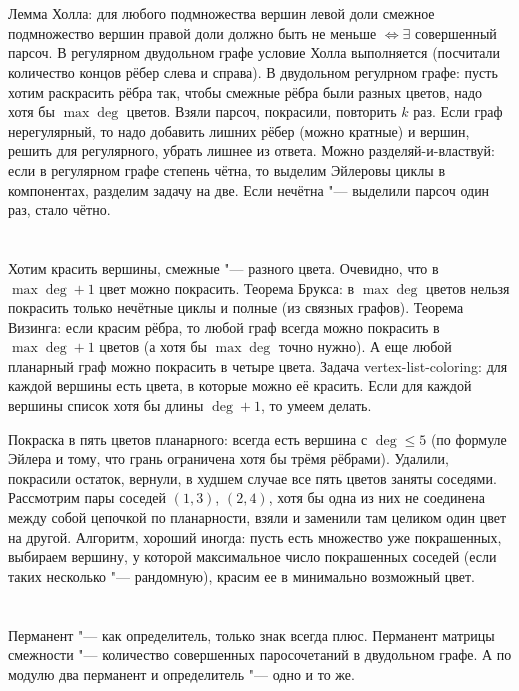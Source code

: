 \section{} %
Лемма Холла: для любого подмножества вершин левой доли смежное подмножество вершин правой доли должно быть не меньше $\iff \exists$ совершенный парсоч.
В регулярном двудольном графе условие Холла выполняется (посчитали количество концов рёбер слева и справа).
В двудольном регулрном графе: пусть хотим раскрасить рёбра так, чтобы смежные рёбра были разных цветов, надо хотя бы $\max \deg$ цветов.
Взяли парсоч, покрасили, повторить $k$ раз.
Если граф нерегулярный, то надо добавить лишних рёбер (можно кратные) и вершин, решить для регулярного, убрать лишнее из ответа.
Можно разделяй-и-властвуй: если в регулярном графе степень чётна, то выделим Эйлеровы циклы в компонентах, разделим задачу на две.
Если нечётна "--- выделили парсоч один раз, стало чётно.

\section{} %
Хотим красить вершины, смежные "--- разного цвета.
Очевидно, что в $\max \deg +1$ цвет можно покрасить.
Теорема Брукса: в $\max \deg$ цветов нельзя покрасить только нечётные циклы и полные (из связных графов).
Теорема Визинга: если красим рёбра, то любой граф всегда можно покрасить в $\max \deg + 1$ цветов (а хотя бы $\max \deg$ точно нужно).
А еще любой планарный граф можно покрасить в четыре цвета.
Задача vertex-list-coloring: для каждой вершины есть цвета, в которые можно её красить.
Если для каждой вершины список хотя бы длины $\deg + 1$, то умеем делать.

Покраска в пять цветов планарного: всегда есть вершина с $\deg \le 5$ (по формуле Эйлера и тому, что грань ограничена хотя бы трёмя рёбрами).
Удалили, покрасили остаток, вернули, в худшем случае все пять цветов заняты соседями.
Рассмотрим пары соседей $(1,3)$, $(2,4)$, хотя бы одна из них не соединена между собой цепочкой по планарности, взяли и заменили там целиком один цвет на другой.
Алгоритм, хороший иногда: пусть есть множество уже покрашенных,
выбираем вершину, у которой максимальное число покрашенных соседей (если таких несколько "--- рандомную), красим ее в минимально возможный цвет.

\section{} %
Перманент "--- как определитель, только знак всегда плюс.
Перманент матрицы смежности "--- количество совершенных паросочетаний в двудольном графе.
А по модулю два перманент и определитель "--- одно и то же.

